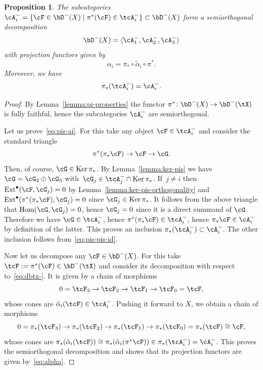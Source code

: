 \documentclass[11pt]{amsart}
\DeclareMathOperator{\Hom}{\mathrm{Hom}}
\DeclareMathOperator{\Ext}{\mathrm{Ext}}
\DeclareMathOperator{\Ker}{\mathrm{Ker}}
\theoremstyle{plain}
\newtheorem{proposition}[theorem]{Proposition}
\theoremstyle{definition}
\theoremstyle{remark}
\begin{document}
\begin{proposition}\label{proposition:sod-dbx-}
The subcategories $\cA_i^- = \{ \cF \in \bD^-(X) \mid  \pi^*(\cF) \in \tcA_i^- \} \subset \bD^-(X)$ form a semiorthogonal decomposition
\begin{equation*}
\bD^-(X) = \langle \cA_1^-, \cA_2^-, \cA_3^- \rangle
\end{equation*}
with projection functors given by
\begin{equation}
\label{eq:alpha}
\alpha_i = \pi_* \circ \tilde\alpha_i \circ \pi^*.
\end{equation}
Moreover, we have
\begin{equation}\label{eq:pis-ai}
\pi_*(\tcA_i^-) = \cA_i^-.
\end{equation}
\end{proposition}
\begin{proof}
By Lemma~\ref{lemma:pi-properties} the functor $\pi^* \colon \bD^-(X) \to \bD^-(\tX)$ is fully faithful, hence the subcategories $\cA_i^-$ are semiorthogonal.

Let us prove~\eqref{eq:pis-ai}.
For this take any object $\cF \in \tcA_i^-$ and consider the standard triangle
\begin{equation*}
\pi^*(\pi_*\cF) \to \cF \to \cG.
\end{equation*}
Then, of course, $\cG \in \Ker\pi_*$.
By Lemma~\ref{lemma:ker-pis} we have $\cG = \cG_2 \oplus \cG_3$ with~$\cG_j \in \tcA_j^- \cap \Ker \pi_*$.
If~$j \ne i$ then~$\Ext^\bullet(\cF,\cG_j) = 0$ by Lemma~\ref{lemma:ker-pis-orthogonality} and $\Ext^\bullet(\pi^*(\pi_*\cF),\cG_j) = 0$ since $\cG_j \in \Ker  \pi_*$.
It follows from the above triangle that $\Hom(\cG,\cG_j) = 0$, hence $\cG_j = 0$ since it is a direct summand of $\cG$.
Therefore we have $\cG \in \tcA_i^-$, hence $\pi^*(\pi_*\cF) \in \tcA_i^-$, hence $\pi_*\cF \in \cA_i^-$ by definition of the latter.
This proves an inclusion $\pi_*(\tcA_i^-) \subset \cA_i^-$.
The other inclusion follows from~\eqref{eq:pis-pis-id}.

Now let us decompose any $\cF \in \bD^-(X)$.
For this take $\tcF := \pi^*(\cF) \in \bD^-(\tX)$ and consider its decomposition with respect to~\eqref{eq:dbtx-}.
It is given by a chain of morphisms 
\begin{equation*}
0 = \tcF_3 \rightarrow \tcF_2 \rightarrow \tcF_1 \rightarrow \tcF_0 = \tcF,
\end{equation*}
whose cones are $\tilde\alpha_i(\tcF) \in \tcA_i^-$.
Pushing it forward to $X$, we obtain a chain of morphisms 
\begin{equation*}
0 = \pi_*(\tcF_3) \rightarrow \pi_*(\tcF_2) \rightarrow \pi_*(\tcF_1) \rightarrow \pi_*(\tcF_0) = \pi_*(\tcF) \cong \cF,
\end{equation*}
whose cones are $\pi_*(\tilde\alpha_i(\tcF)) \cong \pi_*(\tilde\alpha_i(\pi^*\cF)) \in \pi_*(\tcA_i^-) = \cA_i^-$.
This proves the semiorthogonal decomposition and shows that its projection functors are given by~\eqref{eq:alpha}.
\end{proof}
\end{document}
